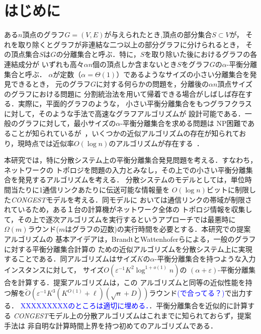 \documentclass{thesis}
\theoremstyle{definition}
\newcommand{\Izumi}[1]{\textcolor{blue}{#1}}
\begin{document}
\baselineskip=22pt
\pagestyle{empty}

\maketitle

\pagestyle{myheadings}	%
\tableofcontents

\newpage


\chapter{はじめに}

ある$n$頂点のグラフ$G=(V,E)$が与えられたとき,頂点の部分集合$S \subset V$が，
それを取り除くとグラフが非連結な二つ以上の部分グラフに分けられるとき，
その頂点集合$S$は$G$の分離集合と呼ぶ．特に，$S$を取り除いた後におけるグラフの各連結成分が
いずれも高々$\alpha n$個の頂点しか含まないとき$S$をグラフ$G$の$\alpha$-平衡分離集合と呼ぶ．
$\alpha$が定数（$\alpha = \Theta(1)$）であるようなサイズの小さい分離集合を発見できるとき，
元のグラフ$G$に対する何らかの問題を，分離後の$\alpha n$頂点サイズのグラフにおける問題に
分割統治法を用いて帰着できる場合がしばしば存在する．実際に，平面的グラフのような，
小さい平衡分離集合をもつグラフクラスに対して，そのような手法で高速なグラフアルゴリズムが
設計可能である．一般のグラフに対して，最小サイズの$\alpha$-平衡分離集合を求める問題は
NP困難であることが知られているが~\cite{bui1992finding}，いくつかの近似アルゴリズムの存在が知られており，現時点では近似率$O(\log n)$のアルゴリズムが存在する~\cite{}．

本研究では，特に分散システム上の平衡分離集合発見問題を考える．すなわち，ネットワークの
トポロジを問題の入力とみなし，その上での小さい平衡分離集合を発見するアルゴリズムを考える．
分散システムのモデルとしては，単位時間当たりに1通信リンクあたりに伝送可能な情報量を
$O(\log n)$ビットに制限した\textit{CONGEST}モデルを考える．同モデルに
おいては通信リンクの帯域が制限されているため，ある１台の計算機がネットワーク全体の
トポロジ情報を収集して，その上で逐次アルゴリズムを実行するというアプローチでは最悪時に
$\Omega(m)$ラウンド($m$はグラフの辺数)の実行時間を必要とする．本研究での提案アルゴリズムの
基本アイデアは，BrandtとWattenhoferらによる，一般のグラフに対する平衡分離集合計算の
ための近似アルゴリズム\cite{brandt2017approximating}を分散システム上に実現することである．同アルゴリズムはサイズ$K$の$\alpha$-平衡分離集合を持つような入力インスタンスに対して，
サイズ$O(\varepsilon^{-1}K^2\log^{1+o(1)}n)$の $(\alpha + \varepsilon)$-平衡分離集合を計算する．提案アルゴリズムは，この
アルゴリズムと同等の近似性能を持つ解を$\tilde{O}(\varepsilon^{-1}K^3(K^{O(1)}+\ell)(\sqrt{n}+D))$ラウンド\Izumi{(で合ってる？)}で出力する．
\Izumi{XXXXXXXXXのところは適切に埋める．}．平衡分離集合を近似的に計算する
\textit{CONGEST}モデル上の分散アルゴリズムはこれまでに知られておらず，提案手法は
非自明な計算時間上界を持つ初めてのアルゴリズムである．
\end{document}
